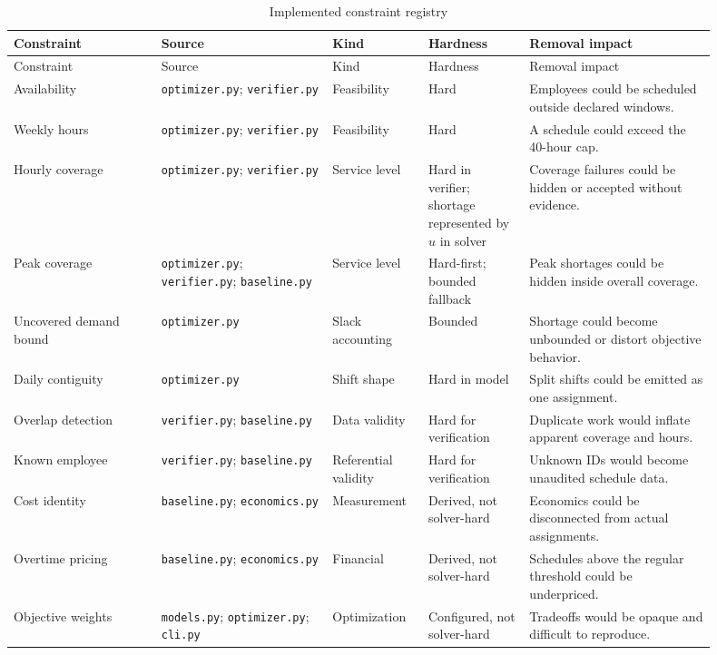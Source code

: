 \documentclass[11pt,a4paper]{article}
\begin{document}
\begin{longtable}{p{0.19\linewidth}p{0.22\linewidth}p{0.12\linewidth}p{0.13\linewidth}p{0.24\linewidth}}
\caption{Implemented constraint registry}\label{tab:registry}\\
\toprule
Constraint & Source & Kind & Hardness & Removal impact\\
\midrule
\endfirsthead
\toprule
Constraint & Source & Kind & Hardness & Removal impact\\
\midrule
\endhead
Availability & \texttt{optimizer.py}; \texttt{verifier.py} & Feasibility & Hard & Employees could be scheduled outside declared windows.\\
Weekly hours & \texttt{optimizer.py}; \texttt{verifier.py} & Feasibility & Hard & A schedule could exceed the 40-hour cap.\\
Hourly coverage & \texttt{optimizer.py}; \texttt{verifier.py} & Service level & Hard in verifier; shortage represented by $u$ in solver & Coverage failures could be hidden or accepted without evidence.\\
Peak coverage & \texttt{optimizer.py}; \texttt{verifier.py}; \texttt{baseline.py} & Service level & Hard-first; bounded fallback & Peak shortages could be hidden inside overall coverage.\\
Uncovered demand bound & \texttt{optimizer.py} & Slack accounting & Bounded & Shortage could become unbounded or distort objective behavior.\\
Daily contiguity & \texttt{optimizer.py} & Shift shape & Hard in model & Split shifts could be emitted as one assignment.\\
Overlap detection & \texttt{verifier.py}; \texttt{baseline.py} & Data validity & Hard for verification & Duplicate work would inflate apparent coverage and hours.\\
Known employee & \texttt{verifier.py}; \texttt{baseline.py} & Referential validity & Hard for verification & Unknown IDs would become unaudited schedule data.\\
Cost identity & \texttt{baseline.py}; \texttt{economics.py} & Measurement & Derived, not solver-hard & Economics could be disconnected from actual assignments.\\
Overtime pricing & \texttt{baseline.py}; \texttt{economics.py} & Financial & Derived, not solver-hard & Schedules above the regular threshold could be underpriced.\\
Objective weights & \texttt{models.py}; \texttt{optimizer.py}; \texttt{cli.py} & Optimization & Configured, not solver-hard & Tradeoffs would be opaque and difficult to reproduce.\\

\end{longtable}
\end{document}
